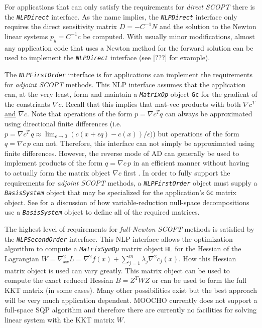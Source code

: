 \documentclass[pdf,ps2pdf,11pt]{SANDreport}
\begin{document}
For applications that can only satisfy the requirements for
{}\textit{direct SCOPT} there is the {}\texttt{\textit{NLP\-Direct}}
interface.  As the name implies, the {}\texttt{\textit{NLP\-Direct}}
interface only requires the direct sensitivity matrix $D = -C^{-1} N$
and the solution to the Newton linear systems $p_y = C^{-1} c$ be
computed.  With usually minor modifications, almost any application
code that uses a Newton method for the forward solution can be used to
implement the
{}\texttt{\textit{NLPDirect}} interface (see [???] for example).

The {}\texttt{\textit{NLP\-First\-Order}} interface is for applications
can implement the requirements for \textit{adjoint SCOPT} methods.
This NLP interface assumes that the application can, at the very
least, form and maintain a
{}\texttt{\textit{Matrix\-Op}} object {}\texttt{Gc} for the gradient of
the constriants $\nabla c$.  Recall that this implies that mat-vec
products with both $\nabla c^T$ \underline{and} $\nabla c$.  Note that
operations of the form $p = \nabla c^T q$ can always be approximated
using directional finite differences (i.e.\ $p = \nabla c^T \, q
\approx \lim_{\epsilon \rightarrow 0} ( c(x+\epsilon q) - c(x) ) /
\epsilon )$) but operations of the form $q = \nabla c \, p$ can not.
Therefore, this interface can not simply be approximated using finite
differences.  However, the reverse mode of AD can generally be used to
implement products of the form $q = \nabla c \, p$ in an efficient manner
without having to actually form the matrix object $\nabla c$ first
{}\cite{ref:adolc_1996}.  In order to fully support the requirements for
{}\textit{adjoint SCOPT} methods, a {}\texttt{\textit{NLP\-First\-Order}} object must
supply a {}\texttt{\textit{Basis\-System}} object that may be specialized for
the application's {}\texttt{Gc} matrix object.  See
{}\cite{ref:moochodevguide} for a discussion of how variable-reduction
null-space decompositions use a {}\texttt{\textit{Basis\-System}} object to
define all of the required matrices.

The highest level of requirements for \textit{full-Newton SCOPT}
methods is satisfied by the {}\texttt{\textit{NLP\-Second\-Order}}
interface.  This NLP interface allows the optimization algorithm to
compute a {}\texttt{\textit{Matrix\-Sym\-Op}} matrix object {}\texttt{HL}
for the Hessian of the Lagrangian $W =
\nabla^2_{xx} L = \nabla^2 f(x) + \sum^m_{j=1} \lambda_j \nabla^2
c_j(x)$.  How this Hessian matrix object is used can vary greatly.  This
matrix object can be used to compute the exact reduced Hessian $B = Z^T W Z$
or can be used to form the full KKT matrix (in some cases).  Many other
possibilities exist but the best approach will be very much application
dependent.  MOOCHO currently does not support a full-space SQP algorithm and
therefore there are currently no facilities for solving linear system with the
KKT matrix $W$.
\end{document}

